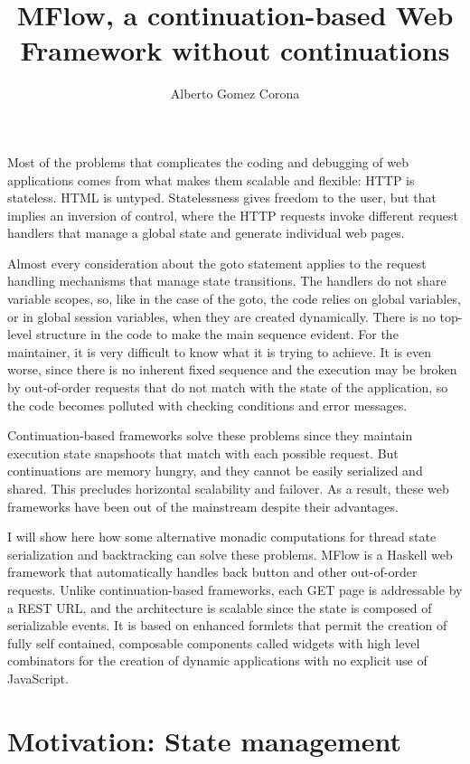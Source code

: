 \documentclass{tmr}
\title{MFlow, a continuation-based Web Framework without continuations}
\author{Alberto Gomez Corona\email{agocorona@gmail.com}}
\begin{document}
 
\begin{introduction} 
Most of the problems that complicates the coding and debugging of web applications comes from what makes them scalable and flexible: HTTP is stateless. HTML is untyped. Statelessness gives freedom to the user, but that implies an inversion of control, where the HTTP requests invoke different request handlers that manage a global state and generate individual web pages. 

Almost every consideration about the goto statement applies to the request handling mechanisms that manage state transitions. The  handlers do not share variable scopes, so, like in the case of the goto, the code relies on global variables, or in global session variables, when they are created dynamically. There is no top-level structure in the code to make the main sequence evident. For the maintainer, it is very difficult to know what it is trying to achieve. It is even worse, since there is no inherent fixed sequence and the execution may be broken by out-of-order requests that do not match with the state of the application, so the code becomes polluted with checking conditions and error messages. 
 
Continuation-based frameworks solve these problems since they maintain execution state snapshoots that match with each possible request. But continuations are memory hungry, and they cannot be easily serialized and shared. This precludes horizontal scalability and failover. As a result, these web frameworks have been out of the mainstream despite their advantages. 
 
I will show here how some alternative monadic computations for thread state serialization and backtracking can solve these problems. MFlow\cite{auth:mflow} is a Haskell web framework that automatically handles back button and other out-of-order requests. Unlike continuation-based frameworks, each GET page is addressable by a REST URL, and the  architecture is scalable since the state is composed of serializable events. It is based on enhanced formlets that permit the creation of fully self contained, composable components called widgets with high level combinators for the creation of dynamic applications with no explicit use of JavaScript. 
 
\end{introduction} 
 
 
\section{ Motivation: State management} 
 
\end{document}
